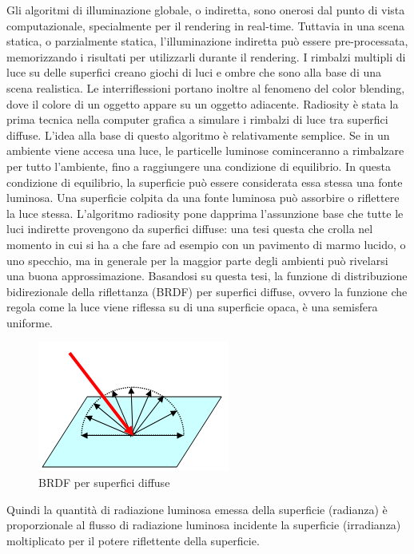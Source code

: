 Gli algoritmi di illuminazione globale, o indiretta, sono onerosi dal punto di vista computazionale, specialmente per il rendering in real-time. 
Tuttavia in una scena statica, o parzialmente statica, l’illuminazione indiretta può essere pre-processata, memorizzando i risultati per utilizzarli durante il rendering. 
I rimbalzi multipli di luce su delle superfici creano giochi di luci e ombre che sono alla base di una scena realistica. Le interriflessioni portano inoltre al fenomeno del color blending, dove il colore di un oggetto appare su un oggetto adiacente. 
Radiosity è stata la prima tecnica nella computer grafica a simulare i rimbalzi di luce tra superfici diffuse. 
L’idea alla base di questo algoritmo è relativamente semplice. Se in un ambiente viene accesa una luce, le particelle luminose cominceranno a rimbalzare per tutto l’ambiente, fino a raggiungere una condizione di equilibrio. In questa condizione di equilibrio, la superficie può essere considerata essa stessa una fonte luminosa. 
Una superficie colpita da una fonte luminosa può assorbire o riflettere la luce stessa. L’algoritmo radiosity pone dapprima l’assunzione base che tutte le luci indirette provengono da superfici diffuse: una tesi questa che crolla nel momento in cui si ha a che fare ad esempio con un pavimento di marmo lucido, o uno specchio, ma in generale per la maggior parte degli ambienti può rivelarsi una buona approssimazione. Basandosi su questa tesi, la funzione di distribuzione bidirezionale della riflettanza (BRDF) per superfici diffuse, ovvero la funzione che regola come la luce viene riflessa su di una superficie opaca, è una semisfera uniforme.
\\
\begin{figure}[htb]
 \centering
 \includegraphics[width=0.5\linewidth]{images/chapter_stato_arte/stato_attuale_brdf_semistefa.png}\hfill
 \caption[BRDF superfici diffuse]{BRDF per superfici diffuse}
 \label{fig:stato_attuale_brdf_semistefa}
\end{figure}
Quindi la quantità di radiazione luminosa emessa della superficie (radianza) è proporzionale al flusso di radiazione luminosa incidente la superficie (irradianza) moltiplicato per il potere riflettente della superficie. 

